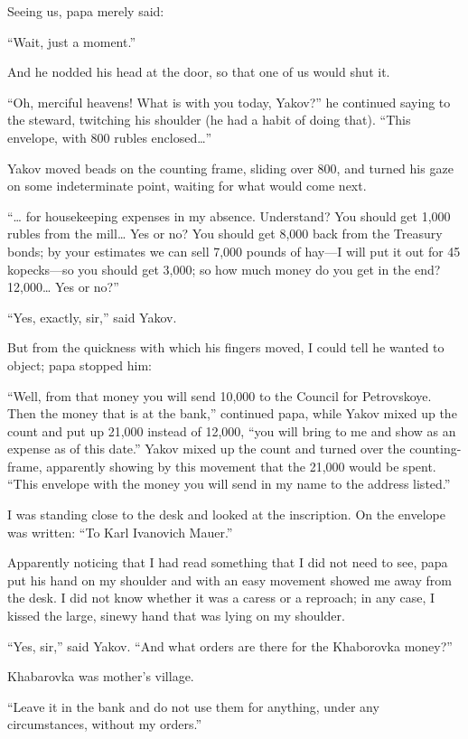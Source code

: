 Seeing us, papa merely said:

``Wait, just a moment.'' %

And he nodded his head at the door, so that one of us would shut it.

``Oh, merciful heavens! What is with you today, Yakov?'' he continued saying to the steward, twitching his shoulder (he had a habit of doing that). ``This envelope, with 800 rubles enclosed\ldots{}'' %

Yakov moved beads on the counting frame, sliding over 800, and turned his gaze on some indeterminate point, waiting for what would come next.

``\ldots{} for housekeeping expenses in my absence. Understand? You should get 1,000 rubles from the mill\ldots{} Yes or no? You should get 8,000 back from the Treasury bonds; by your estimates we can sell 7,000 pounds of hay---I will put it out for 45 kopecks---so you should get 3,000; so how much money do you get in the end? 12,000\ldots{} Yes or no?'' %

``Yes, exactly, sir,'' said Yakov. %

But from the quickness with which his fingers moved, I could tell he wanted to object; papa stopped him:

``Well, from that money you will send 10,000 to the Council for Petrovskoye. Then the money that is at the bank,'' continued papa, while Yakov mixed up the count and put up 21,000 instead of 12,000, ``you will bring to me and show as an expense as of this date.'' Yakov mixed up the count and turned over the counting-frame, apparently showing by this movement that the 21,000 would be spent. ``This envelope with the money you will send in my name to the address listed.'' %

I was standing close to the desk and looked at the inscription. On the envelope was written: ``To Karl Ivanovich Mauer.''

Apparently noticing that I had read something that I did not need to see, papa put his hand on my shoulder and with an easy movement showed me away from the desk. I did not know whether it was a caress or a reproach; in any case, I kissed the large, sinewy hand that was lying on my shoulder.

``Yes, sir,'' said Yakov. ``And what orders are there for the Khaborovka money?'' %

Khabarovka was mother's village.

``Leave it in the bank and do not use them for anything, under any circumstances, without my orders.'' %

